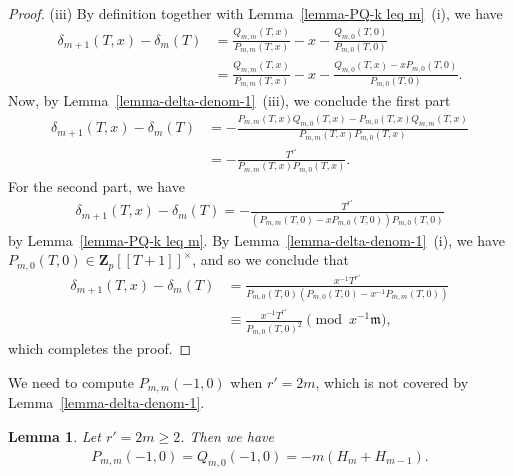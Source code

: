 \documentclass[11pt]{amsart}
\theoremstyle{definition}
\numberwithin{equation}{subsection}
\theoremstyle{plain}
\theoremstyle{plain}
\theoremstyle{plain}
\theoremstyle{plain}
\theoremstyle{plain}
\theoremstyle{plain}
\theoremstyle{plain}
\theoremstyle{plain}
\theoremstyle{plain}
\newtheorem{lemm}[equation]{Lemma}
\theoremstyle{plain}
\theoremstyle{plain}
\theoremstyle{plain}
\theoremstyle{definition}
\theoremstyle{definition}
\theoremstyle{definition}
\theoremstyle{remark}
\renewcommand{\(}{\textup{(}}
\renewcommand{\)}{\textup{)}}
\newcommand{\Z}{\mathbf{Z}}
\newcommand{\fm}{\mathfrak{m}}
\begin{document}
\begin{proof}
(iii) By definition together with Lemma~\ref{lemma-PQ-k leq m}~(i), we have
\begin{align*}
        \delta_{m+1}(T,x)-\delta_m(T)
         &=\frac{Q_{m,m}(T,x)}{P_{m,m}(T,x)}-x-\frac{Q_{m,0}(T,0)}{P_{m,0}(T,0)}\\
         &=\frac{Q_{m,m}(T,x)}{P_{m,m}(T,x)}-x-\frac{Q_{m,0}(T,x)-xP_{m,0}(T,0)}{P_{m,0}(T,0)}.
\end{align*}
Now, by Lemma~\ref{lemma-delta-denom-1}~(iii), we conclude the first part
    \begin{align*}
        \delta_{m+1}(T,x)-\delta_m(T)
        &=-\frac{P_{m,m}(T,x)Q_{m,0}(T,x)-P_{m,0}(T,x)Q_{m,m}(T,x)}{P_{m,m}(T,x)P_{m,0}(T,x)}\\
        &=-\frac{T^{r'}}{P_{m,m}(T,x)P_{m,0}(T,x)}.
    \end{align*}
For the second part, we have
    \begin{align*}
        \delta_{m+1}(T,x)-\delta_m(T)
        =-\frac{T^{r'}}{(P_{m,m}(T,0)-xP_{m,0}(T,0))P_{m,0}(T,0)}
    \end{align*}
by Lemma~\ref{lemma-PQ-k leq m}. By Lemma~\ref{lemma-delta-denom-1}~(i), we have $P_{m,0}(T,0)\in\Z_p[[T+1]]^{\times}$, and so we conclude that
\begin{align*}
        \delta_{m+1}(T,x)-\delta_m(T)
        &=
        \frac{x^{-1}T^{r'}}{P_{m,0}(T,0)(P_{m,0}(T,0)-x^{-1}P_{m,m}(T,0))}\\
        &\equiv
        \frac{x^{-1}T^{r'}}{P_{m,0}(T,0)^2}
        \pmod{x^{-1}\fm},
    \end{align*}
which completes the proof.
\end{proof}




We need to compute $P_{m,m}(-1,0)$ when $r'=2m$, which is not covered by Lemma~\ref{lemma-delta-denom-1}.
\begin{lemm}\label{lemma-P-2m-m}
Let $r'=2m\geq 2$. Then we have
    \begin{align*}
        P_{m,m}(-1,0)=Q_{m,0}(-1,0)=-m(H_m+H_{m-1}).
    \end{align*}
\end{lemm}
\end{document}
